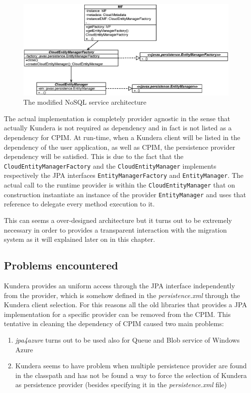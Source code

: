 \begin{figure}[tbh]
  \centering
  \includegraphics[width=14cm]{images/cpim_nosql_kundera}
  \caption{The modified NoSQL service architecture}
  \label{fig:cpim-kundera}
\end{figure}

\noindent The actual implementation is completely provider agnostic in the sense that actually Kundera is not required as dependency and in fact is not listed as a dependency for CPIM. At run-time, when a Kundera client will be listed in the dependency of the user application, as well as CPIM, the persistence provider dependency will be satisfied.
This is due to the fact that the \texttt{CloudEntityManagerFactory} and the \texttt{CloudEntityManager} implements respectively the JPA interfaces  \texttt{EntityManagerFactory}  and \texttt{EntityManager}.
The actual call to the runtime provider is within the \texttt{CloudEntityManager} that on construction instantiate an instance of the provider \texttt{EntityManager} and uses that reference to delegate every method execution to it.

\noindent This can seems a over-designed architecture but it turns out to be extremely necessary in order to provides a transparent interaction with the migration system as it will explained later on in this chapter.

\subsection{Problems encountered}
Kundera provides an uniform access through the JPA interface independently from the provider, which is somehow defined in the \textit{persistence.xml} through the Kundera client selection. For this reasons all the old libraries that provides a JPA implementation for a specific provider can be removed from the CPIM. 
This tentative in cleaning the dependency of CPIM caused two main problems:
\begin{enumerate}
\item \textit{jpa4azure} turns out to be used also for Queue and Blob service of Windows Azure
\item Kundera seems to have problem when multiple persistence provider are found in the classpath and has not be found a way to force the selection of Kundera as persistence provider (besides specifying it in the \textit{persistence.xml} file)
\end{enumerate} 

